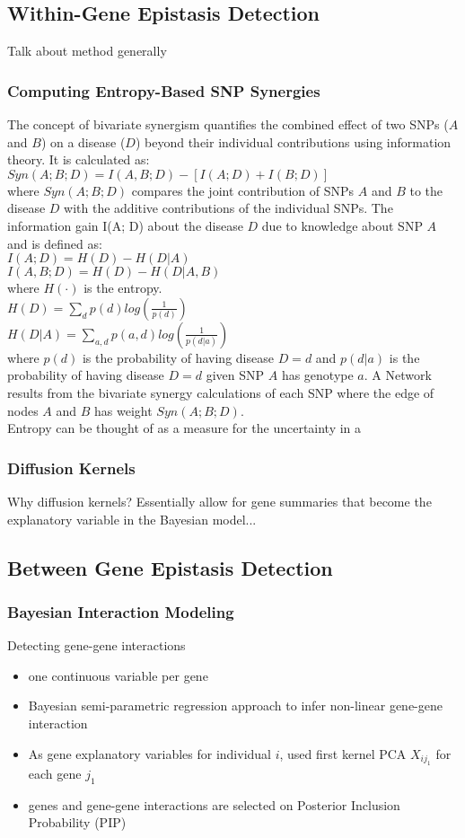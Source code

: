 \documentclass{article}\usepackage[]{graphicx}\usepackage[]{color}
\begin{document}
\subsection{Within-Gene Epistasis Detection}
Talk about method generally
\subsubsection{Computing Entropy-Based SNP Synergies}
The concept of bivariate synergism quantifies the combined effect of two SNPs ($A$ and $B$) on a disease ($D$) beyond their individual contributions using information theory. It is calculated as:\\
$Syn(A; B; D) = I(A, B; D) -[I(A; D) + I(B; D)]$\\
where $Syn(A; B; D)$ compares the joint contribution of SNPs $A$ and $B$ to the disease $D$ with the additive contributions of the individual SNPs. The information gain I(A; D) about the disease $D$ due to knowledge about SNP $A$ and is defined as:\\
$I(A; D) = H(D) - H(D|A) $\\
$I(A, B; D) = H(D) - H(D|A, B)$ \\ where $H(\cdot)$ is the entropy. \\
$H(D) = \sum_d p(d)log(\frac{1}{p(d)})$\\
$H(D|A) = \sum_{a,d} p(a,d)log(\frac{1}{p(d|a)})$\\ where $p(d)$ is the probability of having disease $D=d$ and $p(d|a)$ is the probability of having disease $D=d$ given SNP $A$ has genotype $a$.
A Network results from the bivariate synergy calculations of each SNP where the edge of nodes $A$ and $B$ has weight $Syn(A; B; D)$.\\
Entropy can be thought of as a measure for the uncertainty in a 
\subsubsection{Diffusion Kernels}
Why diffusion kernels? Essentially allow for gene summaries that become the explanatory variable in the Bayesian model...

\subsection{Between Gene Epistasis Detection}
\subsubsection{Bayesian Interaction Modeling}
Detecting gene-gene interactions
\begin{itemize}
\item one continuous variable per gene
\item Bayesian semi-parametric regression approach to infer non-linear gene-gene interaction
\item As gene explanatory variables for individual $i$, used first kernel PCA $X_{ij_1}$ for each gene $j_1$
\item genes and gene-gene interactions are selected on Posterior Inclusion Probability (PIP)
\end{itemize}
\end{document}
